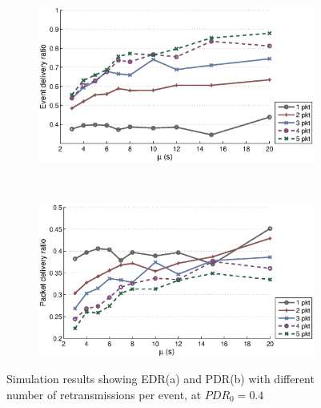 \begin{figure}[p]
    \centering
    \begin{subfigure}[t]{0.9\textwidth}
        \centering
        \includegraphics[width=\textwidth] {../../sw/pc/matlab/simulation-result/retrans-count-edr-20min-pdr0.4.eps}
        \caption{}
    \end{subfigure} 
    \\
    \begin{subfigure}[t]{0.9\textwidth}
        \centering
        \includegraphics[width=\textwidth] {../../sw/pc/matlab/simulation-result/retrans-count-pdr-20min-pdr0.4.eps}
        \caption{}
    \end{subfigure}
    \caption[EDR and PDR with different transmission redundancy, $PDR_0 = 0.4$]{Simulation results showing EDR(a) and PDR(b) with different number of retransmissions per event, at $PDR_0 = 0.4$}\label{fig:retrans-lambda-0.4}
\end{figure}


